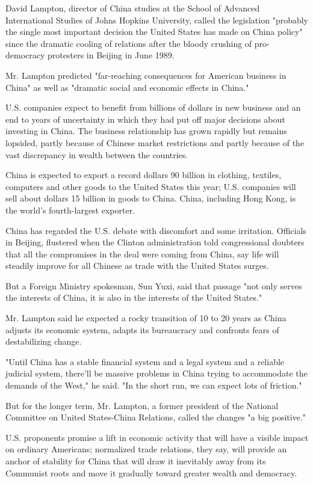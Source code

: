 David Lampton, director of China studies at the School of Advanced
International Studies of Johns Hopkins University, called the
legislation "probably the single most important decision the United
States has made on China policy" since the dramatic cooling of relations
after the bloody crushing of pro-democracy protesters in Beijing in June
1989.

Mr. Lampton predicted "far-reaching consequences for American business
in China" as well as "dramatic social and economic effects in China."

U.S. companies expect to benefit from billions of dollars in new
business and an end to years of uncertainty in which they had put off
major decisions about investing in China. The business relationship has
grown rapidly but remains lopsided, partly because of Chinese market
restrictions and partly because of the vast discrepancy in wealth
between the countries.

China is expected to export a record dollars 90 billion in clothing,
textiles, computers and other goods to the United States this year; U.S.
companies will sell about dollars 15 billion in goods to China. China,
including Hong Kong, is the world's fourth-largest exporter.

China has regarded the U.S. debate with discomfort and some irritation.
Officials in Beijing, flustered when the Clinton administration told
congressional doubters that all the compromises in the deal were coming
from China, say life will steadily improve for all Chinese as trade with
the United States surges.

But a Foreign Ministry spokesman, Sun Yuxi, said that passage "not only
serves the interests of China, it is also in the interests of the United
States."

Mr. Lampton said he expected a rocky transition of 10 to 20 years as
China adjusts its economic system, adapts its bureaucracy and confronts
fears of destabilizing change.

"Until China has a stable financial system and a legal system and a
reliable judicial system, there'll be massive problems in China trying
to accommodate the demands of the West," he said. "In the short run, we
can expect lots of friction."

But for the longer term, Mr. Lampton, a former president of the National
Committee on United States-China Relations, called the changes "a big
positive."

U.S. proponents promise a lift in economic activity that will have a
visible impact on ordinary Americans; normalized trade relations, they
say, will provide an anchor of stability for China that will draw it
inevitably away from its Communist roots and move it gradually toward
greater wealth and democracy.

